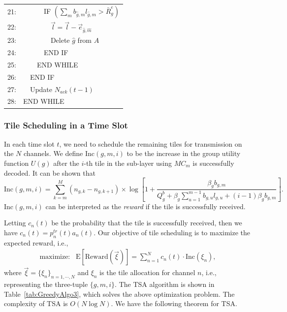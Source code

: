 \documentclass[12pt,onecolumn,draftclsnofoot]{IEEEtran} %
\begin{document}
\begin{table} [!t]
\begin{center}
\begin{tabular}{ll}
21: & \ \ \ \ \ \ IF $\left( \sum_m b_{\hat{g},m}l_{\hat{g},m} > \bar{R}^e_g \right)$ \\
22: & \ \ \ \ \ \ \ \ $\vec{l}=\vec{l}-\vec{e}_{\hat{g},\hat{m}}$ \\
23: & \ \ \ \ \ \ \ \ Delete $\hat{g}$ from $A$ \\
24: & \ \ \ \ \ \ END IF \\
25: & \ \ \ \ END WHILE \\
26: & \ \ END IF \\
27: & \ \ Update $N_{ack}(t-1)$ \\
28: & END WHILE \\
\hline
\end{tabular}
\label{tab:GreedyAlgo2}
\end{center}
\end{table}



\subsubsection{Tile Scheduling in a Time Slot \label{subsec:schedule}}

In each time slot $t$, we need to schedule the remaining tiles for transmission on the $N$ channels.  We define $\mbox{Inc}(g,m,i)$ to be the increase in the group utility function $U(g)$ after the $i$-th tile in the sub-layer using $MC_m$ is successfully decoded. It can be shown that
$$
\mbox{Inc}(g,m,i) = \sum_{k=m}^M (n_{g,k}-n_{g,k+1}) \times 
\log \left[ 1+\frac{\beta_gb_{g,m}}{Q_g^b+\beta_g\sum_{u=1}^{m-1}b_{g,u}l_{g,u}+(i-1)\beta_gb_{g,m}} \right]. \nonumber
$$
$\mbox{Inc}(g,m,i)$ can be interpreted as the {\em reward} if the tile is successfully received. 

Letting $c_n(t)$ be the probability that the tile is successfully received, then we have $c_n(t) = p^{tr}_n(t) a_n(t)$.  Our objective of tile scheduling is to maximize the expected reward, i.e.,
\begin{eqnarray} \label{eq:mreward}
  \mbox{maximize:} \;\;\; \mbox{E} [\mbox{Reward}(\vec{\xi})] = \sum_{n=1}^N c_n(t) \cdot \mbox{Inc}(\xi_n),
\end{eqnarray}
where $\vec{\xi} = \{ \xi_n \}_{n=1,\cdots,N}$ and $\xi_n$ is the tile allocation for channel $n$, i.e., representing the three-tuple $\{g,m,i\}$.  The TSA algorithm is shown in Table~\ref{tab:GreedyAlgo3}, which solves the above optimization problem.  The complexity of TSA is $O(N \log N)$. We have the following theorem for TSA. 
\end{document}
